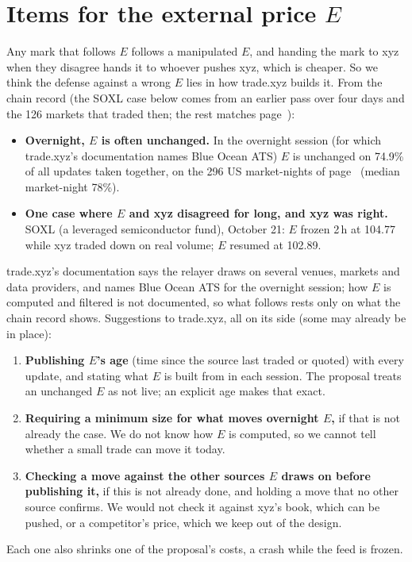 \documentclass[10.5pt,a4paper]{article}
\begin{document}
\section{Items for the external price \texorpdfstring{$E$}{E}}\label{sec:erec}
Any mark that follows $E$ follows a manipulated $E$, and handing the mark to xyz when they disagree hands it to whoever pushes xyz, which is cheaper. So we think the defense against a wrong $E$ lies in how trade.xyz builds it. From the chain record (the SOXL case below comes from an earlier pass over four days and the 126 markets that traded then; the rest matches page~\pageref{sec:feed}):
\begin{itemize}[nosep]
\item \textbf{Overnight, $E$ is often unchanged.} In the overnight session (for which trade.xyz's documentation names Blue Ocean ATS) $E$ is unchanged on 74.9\% of all updates taken together, on the 296 US market-nights of page~\pageref{sec:feed} (median market-night 78\%).
\item \textbf{One case where $E$ and xyz disagreed for long, and xyz was right.} SOXL (a leveraged semiconductor fund), October 21: $E$ frozen 2\,h at 104.77 while xyz traded down on real volume; $E$ resumed at 102.89.
\end{itemize}
trade.xyz's documentation says the relayer draws on several venues, markets and data providers, and names Blue Ocean ATS for the overnight session; how $E$ is computed and filtered is not documented, so what follows rests only on what the chain record shows. Suggestions to trade.xyz, all on its side (some may already be in place):
\begin{enumerate}[nosep]
\item \textbf{Publishing $E$'s age} (time since the source last traded or quoted) with every update, and stating what $E$ is built from in each session. The proposal treats an unchanged $E$ as not live; an explicit age makes that exact.
\item \textbf{Requiring a minimum size for what moves overnight $E$,} if that is not already the case. We do not know how $E$ is computed, so we cannot tell whether a small trade can move it today.
\item \textbf{Checking a move against the other sources $E$ draws on before publishing it,} if this is not already done, and holding a move that no other source confirms. We would not check it against xyz's book, which can be pushed, or a competitor's price, which we keep out of the design.
\end{enumerate}
Each one also shrinks one of the proposal's costs, a crash while the feed is frozen.
\end{document}
